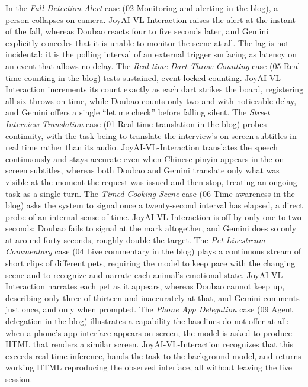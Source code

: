In the \textit{Fall Detection Alert} case (02 Monitoring and alerting in the blog), a person collapses on camera. JoyAI-VL-Interaction raises the alert at the instant of the fall, whereas Doubao reacts four to five seconds later, and Gemini explicitly concedes that it is unable to monitor the scene at all. The lag is not incidental: it is the polling interval of an external trigger surfacing as latency on an event that allows no delay.
The \textit{Real-time Dart Throw Counting} case (05 Real-time counting in the blog) tests sustained, event-locked counting. JoyAI-VL-Interaction increments its count exactly as each dart strikes the board, registering all six throws on time, while Doubao counts only two and with noticeable delay, and Gemini offers a single ``let me check'' before falling silent.
The \textit{Street Interview Translation} case (01 Real-time translation in the blog) probes continuity, with the task being to translate the interview's on-screen subtitles in real time rather than its audio. JoyAI-VL-Interaction translates the speech continuously and stays accurate even when Chinese pinyin appears in the on-screen subtitles, whereas both Doubao and Gemini translate only what was visible at the moment the request was issued and then stop, treating an ongoing task as a single turn.
The \textit{Timed Cooking Scene} case (06 Time awareness in the blog) asks the system to signal once a twenty-second interval has elapsed, a direct probe of an internal sense of time. JoyAI-VL-Interaction is off by only one to two seconds; Doubao fails to signal at the mark altogether, and Gemini does so only at around forty seconds, roughly double the target.
The \textit{Pet Livestream Commentary} case (04 Live commentary in the blog) plays a continuous stream of short clips of different pets, requiring the model to keep pace with the changing scene and to recognize and narrate each animal's emotional state. JoyAI-VL-Interaction narrates each pet as it appears, whereas Doubao cannot keep up, describing only three of thirteen and inaccurately at that, and Gemini comments just once, and only when prompted.
The \textit{Phone App Delegation} case (09 Agent delegation in the blog) illustrates a capability the baselines do not offer at all: when a phone's app interface appears on screen, the model is asked to produce HTML that renders a similar screen. JoyAI-VL-Interaction recognizes that this exceeds real-time inference, hands the task to the background model, and returns working HTML reproducing the observed interface, all without leaving the live session.


